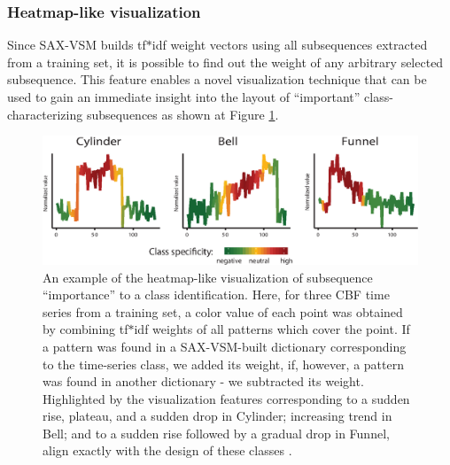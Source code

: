 \subsubsection{Heatmap-like visualization}
Since SAX-VSM builds tf$\ast$idf weight vectors using all subsequences extracted from a
training set, it is possible to find out the weight of any arbitrary selected subsequence.
This feature enables a novel visualization technique that can be used to gain an immediate
insight into the layout of ``important'' class-characterizing subsequences as shown at Figure
\ref{fig:heat}.

\begin{figure}[t]
   \centering
   \includegraphics[width=140mm]{figures/CBF-HEAT.eps}
   \caption{An example of the heatmap-like visualization of subsequence ``importance''
   to a class identification. 
   Here, for three CBF time series from a training set, a color value 
   of each point was obtained by combining tf$\ast$idf weights of all patterns 
   which cover the point.
   If a pattern was found in a SAX-VSM-built dictionary corresponding to the 
   time-series class, we added its weight, if, however, a pattern was found in 
   another dictionary - we subtracted its weight. Highlighted by the visualization 
   features corresponding to a sudden rise, plateau, and a sudden drop in Cylinder;
   increasing trend in Bell;
   and to a sudden rise followed by a gradual drop in Funnel, align exactly with the
   design of these classes \cite{citeulike:12563781}.}
   \label{fig:heat}
\end{figure}

